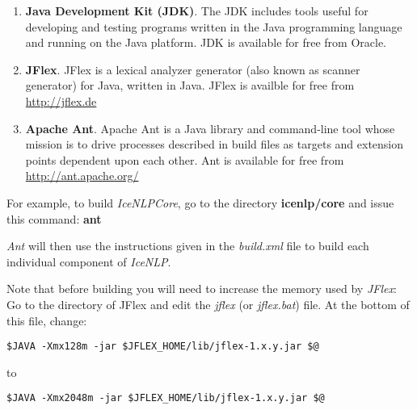 \documentclass[11pt]{article}
\begin{document}
\begin{enumerate}
\item{\bf Java Development Kit (JDK)}.
The JDK includes tools useful for developing and testing programs written in the Java programming language and running on the Java platform.  JDK is available for free from Oracle.

\item{\bf JFlex}.
JFlex is a lexical analyzer generator (also known as scanner generator) for Java, written in Java.
JFlex is availble for free from \url{http://jflex.de}

\item{\bf Apache Ant}.
Apache Ant is a Java library and command-line tool whose mission is to drive processes described in build files as targets and extension points dependent upon each other.
Ant is available for free from \url{http://ant.apache.org/}
\end{enumerate}

For example, to build \emph{IceNLPCore}, go to the directory  {\bf icenlp/core} and issue this command: {\bf ant}

\emph{Ant} will then use the instructions given in the \emph{build.xml} file to build each individual component of \emph{IceNLP}.

Note that before building you will need to increase the memory used by \emph{JFlex}: Go to the directory of JFlex
and edit the \emph{jflex} (or \emph{jflex.bat}) file.
At the bottom of this file, change:

\verb|$JAVA -Xmx128m -jar $JFLEX_HOME/lib/jflex-1.x.y.jar $@|

to

\verb|$JAVA -Xmx2048m -jar $JFLEX_HOME/lib/jflex-1.x.y.jar $@|

\newpage
\begin{spacing}{1.0}


\end{spacing}
\end{document}
